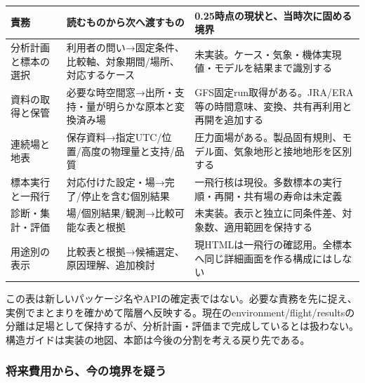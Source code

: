 \documentclass[11pt,a4paper]{article}
\newcounter{none}
\begin{document}
{\def\LTcaptype{none} %
\begin{longtable}[]{@{}
  >{\raggedright\arraybackslash}p{}
  >{\raggedright\arraybackslash}p{}
  >{\raggedright\arraybackslash}p{}@{}}
\toprule\noalign{}
\begin{minipage}[b]{\linewidth}\raggedright
責務
\end{minipage} & \begin{minipage}[b]{\linewidth}\raggedright
読むものから次へ渡すもの
\end{minipage} & \begin{minipage}[b]{\linewidth}\raggedright
0.25時点の現状と、当時次に固める境界
\end{minipage} \\
\midrule\noalign{}
\endhead
\bottomrule\noalign{}
\endlastfoot
分析計画と標本の選択 &
利用者の問い→固定条件、比較軸、対象期間/場所、対応するケース &
未実装。ケース・気象・機体実現値・モデルを結果まで識別する \\
資料の取得と保管 &
必要な時空間窓→出所・支持・量が明らかな原本と変換済み場 &
GFS固定run取得がある。JRA/ERA等の時間意味、変換、共有再利用と再開を追加する \\
連続場と地表 & 保存資料→指定UTC/位置/高度の物理量と支持/品質 &
圧力面場がある。製品固有規則、モデル面、気象地形と接地地形を区別する \\
標本実行と一飛行 & 対応付けた設定・場→完了/停止を含む個別結果 &
一飛行核は現役。多数標本の実行順・再開・共有場の寿命は未定義 \\
診断・集計・評価 & 場/個別結果/観測→比較可能な表と根拠 &
未実装。表示と独立に同条件差、対象数、適用範囲を保持する \\
用途別の表示 & 比較表と根拠→候補選定、原因理解、追加検討 &
現HTMLは一飛行の確認用。全標本へ同じ詳細画面を作る構成にはしない \\
\end{longtable}
}

この表は新しいパッケージ名やAPIの確定表ではない。必要な責務を先に捉え、実例でまとまりを確かめて階層へ反映する。現在のenvironment/flight/resultsの分離は足場として保持するが、分析計画・評価まで完成しているとは扱わない。構造ガイドは実装の地図、本節は今後の分割を考える戻り先である。

\subsubsection{将来費用から、今の境界を疑う}\label{ux5c06ux6765ux8cbbux7528ux304bux3089ux4ecaux306eux5883ux754cux3092ux7591ux3046}
\end{document}
